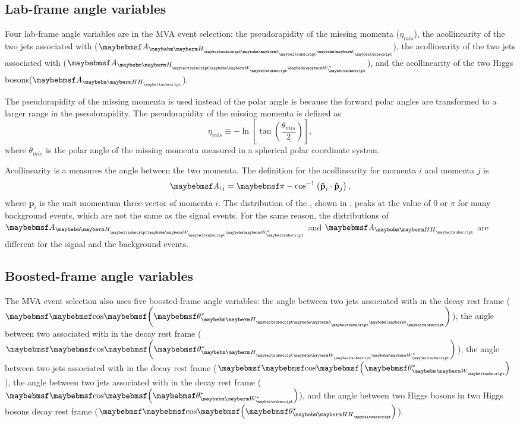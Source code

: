 \subsection{Lab-frame angle variables}

Four lab-frame angle variables are in the MVA event selection: the pseudorapidity of the missing momenta ($\eta_{mis}$), the  acollinearity of the two jets associated with \Hbb ($\acolinearity{\Hbb}$),  the  acollinearity of the two jets associated with \HWW ($\acolinearity{\HWW}$), and the  acollinearity of the two Higgs bosons($\acolinearity{\HH}$).

The pseudorapidity   of the missing momenta is used instead of the polar angle is because the forward polar angles are transformed to a larger range in the pseudorapidity. The pseudorapidity of the missing momenta is defined as
\begin{equation}
\eta_{mis} \equiv  - \ln \left[ \tan \left( \frac{\theta_{mis}}{2} \right) \right],
\end{equation}
where $\theta_{mis}$ is the polar angle of the missing momenta measured in a spherical polar coordinate system.

Acollinearity is a measures the angle between the two momenta. The definition for the acollinearity for momenta $i$ and momenta $j$ is
\begin{equation}
\acolinearity{ij} = \pi - \cos^{-1}\left(\textbf{\^{p}}_i\cdot\textbf{\^{p}}_j\right),
\end{equation}
where $\textbf{\^{p}}_i$ is the unit momentum three-vector of momenta $i$. The distribution of the \acolinearity{\Hbb}, shown in , peaks at the value of 0 or $\pi$ for many background events, which are not the same as the signal events. For the same reason, the distributions of $\acolinearity{\HWW}$ and $\acolinearity{\HH}$ are different for the signal and the background events.

\subsection{Boosted-frame angle variables}

The MVA event selection also uses five boosted-frame angle variables: the angle between two jets associated with \Hbb in the \Hbb decay rest frame ($\cosStar{\Hbb}$), the angle between two \PW associated with \HWW in the \HWW decay rest frame ($\cosStar{\HWW}$), the angle between two jets associated with \PW in the \PW decay rest frame ($\cosStar{\PW}$), the angle between two jets associated with \W* in the \W* decay rest frame ($\cosStar{\W*}$), and the angle between two Higgs bosons in two Higgs bosons decay rest frame ($\cosStar{\HH}$).


